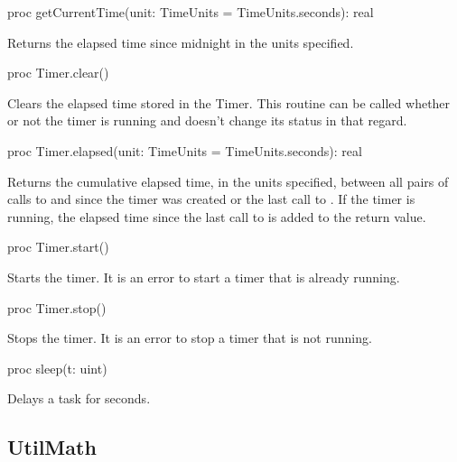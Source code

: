 \begin{protohead}
proc getCurrentTime(unit: TimeUnits = TimeUnits.seconds): real
\end{protohead}
\begin{protobody}
Returns the elapsed time since midnight in the units specified.
\end{protobody}

\begin{protohead}
proc Timer.clear()
\end{protohead}
\begin{protobody}
Clears the elapsed time stored in the Timer.  This routine can be called
whether or not the timer is running and doesn't change its status in that
regard.
\end{protobody}

\begin{protohead}
proc Timer.elapsed(unit: TimeUnits = TimeUnits.seconds): real
\end{protohead}
\begin{protobody}
Returns the cumulative elapsed time, in the units specified, between
all pairs of calls to  and  since the timer was
created or the last call to .  If the timer is running,
the elapsed time since the last call to  is added to the
return value.
\end{protobody}

\begin{protohead}
proc Timer.start()
\end{protohead}
\begin{protobody}
Starts the timer.  It is an error to start a timer that is already
running.
\end{protobody}

\begin{protohead}
proc Timer.stop()
\end{protohead}
\begin{protobody}
Stops the timer.  It is an error to stop a timer that is not running.
\end{protobody}

\begin{protohead}
proc sleep(t: uint)
\end{protohead}
\begin{protobody}
Delays a task for  seconds.
\end{protobody}


\subsection{UtilMath}
\label{StdModules_UtilMath}

